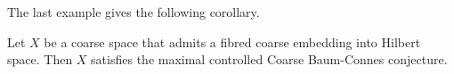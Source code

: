 The last example gives the following corollary.

\begin{cor}
Let $X$ be a coarse space that admits a fibred coarse embedding into Hilbert space. Then $X$ satisfies the maximal controlled Coarse Baum-Connes conjecture. %
\end{cor}
%
